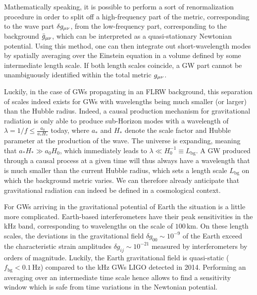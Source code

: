 Mathematically speaking, it is possible to perform a sort of renormalization procedure in order to split off a high-frequency part of the metric, corresponding to the wave part $\delta g_{{\mu \nu}}$, from the low-frequency part, corresponding to the background $\bar{g}_{{\mu \nu}}$, which can be interpreted as a quasi-stationary  Newtonian potential. Using this method, one can then integrate out short-wavelength modes by spatially averaging over the Einstein equation in a volume defined by some intermediate length scale. If both length scales coincide, a GW part cannot be unambiguously identified within the total metric $g_{{\mu \nu}}$.

Luckily, in the case of \acp{GW} propagating in an \ac{FLRW} background, this separation of scales indeed exists for \acp{GW} with wavelengths being much smaller (or larger) than the Hubble radius. Indeed, a causal production mechanism for gravitational radiation is only able to produce sub-Horizon modes with a wavelength of $\lambda = 1/f \le \frac{a_0}{a_* H_*}$ today, where $a_*$ and $H_*$ denote the scale factor and Hubble parameter at the production of the wave. The universe is expanding, meaning that $a_* H_* \gg a_0 H_0$, which immediately leads to $\lambda \ll H_0^{-1} \equiv L_\text{bg} $. A \ac{GW} produced  through a causal process at a given time will thus always have a wavelength that is much smaller than the current Hubble radius, which sets a length scale $L_\text{bg}$ on which the background metric varies. We can therefore already anticipate that gravitational radiation can indeed be defined in a cosmological context.

For \acp{GW} arriving in the gravitational potential of Earth the situation is a little more complicated. Earth-based interferometers have their peak sensitivities in the kHz band, corresponding to wavelengths on the scale of $100 \, \text{km}$. On these length scales, the deviations in the gravitational field $\delta g_{00} \sim 10^{-9}$ of the Earth exceed the characteristic strain  amplitudes $\delta g_{ij}\sim 10^{-21}$ measured by interferometers by orders of magnitude. Luckily, the Earth gravitational field is quasi-static ($f_\text{bg} < 0.1 \, \text{Hz}$) compared to the kHz \acp{GW} \ac{LIGO} detected in 2014. Performing an averaging over an intermediate time scale hence allows to find a sensitivity window which is safe from time variations in the Newtonian potential.

